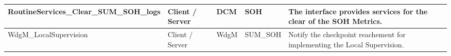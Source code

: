 \begin{longtable}{|l|l|l|l|l|}
\begin{minipage}{0.42\linewidth}\raggedright\vspace{.75ex}RoutineServices\_Clear\_SUM\_SOH\_logs\vspace{.75ex}\end{minipage} & \begin{minipage}{0.07\linewidth}\raggedright\vspace{.75ex}Client / Server\vspace{.75ex}\end{minipage} & \begin{minipage}{0.10\linewidth}\raggedright\vspace{.75ex}DCM\vspace{.75ex}\end{minipage} & \begin{minipage}{0.10\linewidth}\raggedright\vspace{.75ex}SOH\vspace{.75ex}\end{minipage} & \begin{minipage}{0.17\linewidth}\raggedright\vspace{.75ex}The interface provides services for the clear of the SOH Metrics.\vspace{.75ex}\end{minipage}\\\hline
\begin{minipage}{0.42\linewidth}\raggedright\vspace{.75ex}WdgM\_LocalSupervision\vspace{.75ex}\end{minipage} & \begin{minipage}{0.07\linewidth}\raggedright\vspace{.75ex} Client / Server\vspace{.75ex}\end{minipage} & \begin{minipage}{0.10\linewidth}\raggedright\vspace{.75ex}WdgM\vspace{.75ex}\end{minipage} & \begin{minipage}{0.10\linewidth}\raggedright\vspace{.75ex}SUM\_SOH\vspace{.75ex}\end{minipage} & \begin{minipage}{0.17\linewidth}\raggedright\vspace{.75ex}Notify the checkpoint reachement for implementing the Local Supervision.\vspace{.75ex}\end{minipage}\\\hline

\end{longtable}
